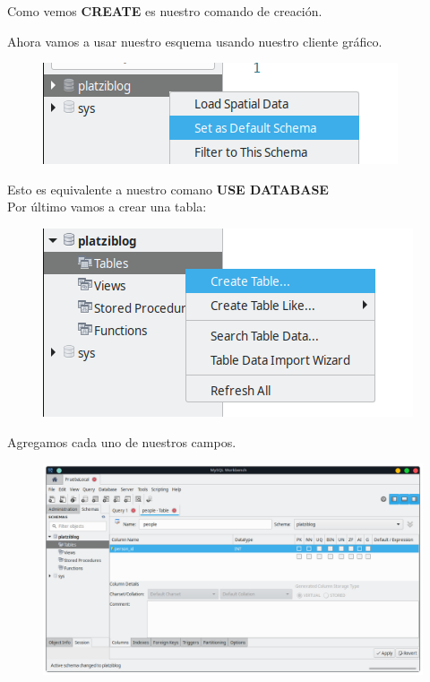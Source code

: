 \documentclass{article}
\begin{document}
Como vemos \textbf{CREATE} es nuestro comando de creación.

\newpage

Ahora vamos a usar nuestro esquema usando nuestro cliente gráfico.\\

\begin{figure}[h!]
  \centering
  \includegraphics[scale=0.65]{./Pictures/043_use_database.png}
\end{figure}

Esto es equivalente a nuestro comano \textbf{USE DATABASE}\\

Por último vamos a crear una tabla:

\begin{figure}[h!]
  \centering
  \includegraphics[scale=0.65]{./Pictures/044_create_table.png}
\end{figure}

Agregamos cada uno de nuestros campos.\\

\begin{figure}[h!]
  \centering
  \includegraphics[scale=0.55]{./Pictures/045_person_id.png}
\end{figure}
\end{document}
